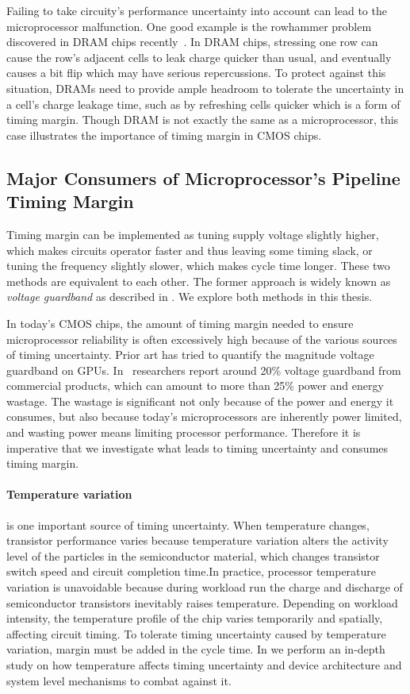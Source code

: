 Failing to take circuity's performance uncertainty into account can lead to the microprocessor malfunction. One good example is the rowhammer problem discovered in DRAM chips recently~\cite{kim2014flipping}. In DRAM chips, stressing one row can cause the row's adjacent cells to leak charge quicker than usual, and eventually causes a bit flip which may have serious repercussions. To protect against this situation, DRAMs need to provide ample headroom to tolerate the uncertainty in a cell's charge leakage time, such as by refreshing cells quicker which is a form of timing margin. Though DRAM is not exactly the same as a microprocessor, this case illustrates the importance of timing margin in CMOS chips.

\subsection{Major Consumers of Microprocessor's Pipeline Timing Margin}
\label{sec:motivation:perf}

Timing margin can be implemented as tuning supply voltage slightly higher, which makes circuits operator faster and thus leaving some timing slack, or tuning the frequency slightly slower, which makes cycle time longer. These two methods are equivalent to each other. The former approach is widely known as \textit{voltage guardband} as described in . We explore both methods in this thesis.

In today's CMOS chips, the amount of timing margin needed to ensure microprocessor reliability is often excessively high because of the various sources of timing uncertainty. Prior art has tried to quantify the magnitude voltage guardband on GPUs. In~\cite{leng2015safe} researchers report around 20\% voltage guardband from commercial products, which can amount to more than 25\% power and energy wastage. The wastage is significant not only because of the power and energy it consumes, but also because today's microprocessors are inherently power limited, and wasting power means limiting processor performance. Therefore it is imperative that we investigate what leads to timing uncertainty and consumes timing margin. 

\paragraph{Temperature variation} is one important source of timing uncertainty. When temperature changes, transistor performance varies because temperature variation alters the activity level of the particles in the semiconductor material, which changes transistor switch speed and circuit completion time.In practice, processor temperature variation is unavoidable because during workload run the charge and discharge of semiconductor transistors inevitably raises temperature. Depending on workload intensity, the temperature profile of the chip varies temporarily and spatially, affecting circuit timing. To tolerate timing uncertainty caused by temperature variation, margin must be added in the cycle time. In \label{sec:tistate} we perform an in-depth study on how temperature affects timing uncertainty and device architecture and system level mechanisms to combat against it.

